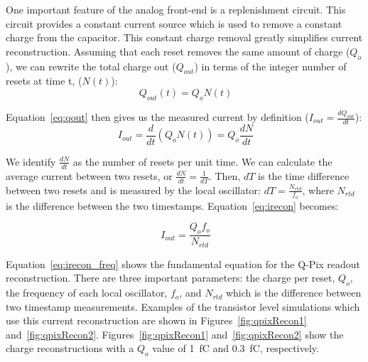 One important feature of the analog front-end is a replenishment circuit.
This circuit provides a constant current source which is used to remove a constant charge from the capacitor.
This constant charge removal greatly simplifies current reconstruction.
Assuming that each reset removes the same amount of charge ($Q_{o}$), we can rewrite the total charge out ($Q_{out}$) in terms of the integer number of resets at time t, ($N(t)$):
\begin{equation}~\label{eq:qout}
Q_{out}(t) = Q_{o} N(t)
\end{equation}

Equation~\ref{eq:qout} then gives us the measured current by definition ($I_{out} = \frac{dQ_{out}}{dt}$):
\begin{equation}~\label{eq:irecon}
I_{out} = \frac{d}{dt}(Q_{o}N(t)) = Q_{o}\frac{dN}{dt}
\end{equation}

We identify $\frac{dN}{dt}$ as the number of resets per unit time.
We can calculate the average current between two resets, or $\frac{dN}{dt} = \frac{1}{dT}$.
Then, $dT$ is the time difference between two resets and is measured by the local oscillator: $dT = \frac{N_{rtd}}{f_{o}}$, where $N_{rtd}$ is the difference between the two timestamps.
Equation~\ref{eq:irecon} becomes:

\begin{equation}~\label{eq:irecon_freq}
\boxed{I_{out} = \frac{Q_{o}f_{o}}{N_{rtd}}}
\end{equation}

Equation~\ref{eq:irecon_freq} shows the fundamental equation for the Q-Pix readout reconstruction.
There are three important parameters: the charge per reset, $Q_{o}$, the frequency of each local oscillator, $f_{o}$, and $N_{rtd}$ which is the difference between two timestamp measurements.
Examples of the transistor level simulations which use this current reconstruction are shown in Figures~\ref{fig:qpixRecon1} and~\ref{fig:qpixRecon2}.
Figures~\ref{fig:qpixRecon1} and~\ref{fig:qpixRecon2} show the charge reconstructions with a $Q_{o}$ value of 1~\unit{fC} and 0.3~\unit{fC}, respectively.

